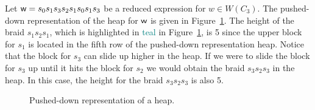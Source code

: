 \begin{example}
Let $\mathsf{w}=s_0s_1s_3s_2s_1s_0s_1s_3$ be a reduced expression for $w \in W(C_3)$. The pushed-down representation of the heap for $\mathsf{w}$ is given in Figure~\ref{fig:pusheddownheap}. The height of the braid $s_1s_2s_1$, which is highlighted in \textcolor{teal}{teal} in Figure~\ref{fig:pusheddownheap}, is 5 since the upper block for $s_1$ is located in the fifth row of the pushed-down representation heap. Notice that the block for $s_3$ can slide up higher in the heap. If we were to slide the block for $s_3$ up until it hits the block for $s_2$ we would obtain the braid $s_3s_2s_3$ in the heap. In this case, the height for the braid $s_3s_2s_3$ is also 5.   

\begin{figure}[h!] \centering
{}	
\caption{Pushed-down representation of a heap.}\label{fig:pusheddownheap}
\end{figure}

	
\end{example}



